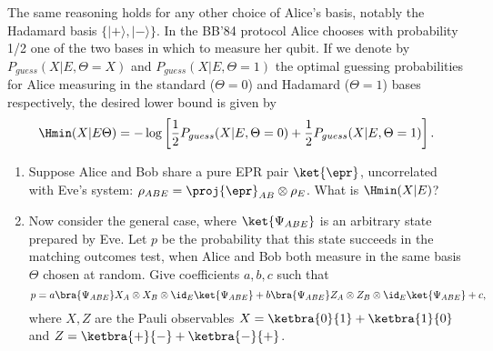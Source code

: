 \begin{exercises}
The same reasoning holds for any other choice of Alice's basis, notably the Hadamard basis $\{|+\rangle,|-\rangle\}$. In the BB'84 protocol Alice chooses with probability 1/2 one of the two bases in which to measure her qubit. If we denote by $P_{guess}(X|E,\Theta=X)$ and $P_{guess}(X|E,\Theta=1)$ the optimal guessing probabilities for Alice measuring in the standard ($\Theta=0$) and Hadamard ($\Theta=1$) bases respectively, the desired lower bound is given by
$$\Hmin(X|E\Theta) = -\log \left[\frac{1}{2}P_{guess}(X|E,\Theta=0)+\frac{1}{2}P_{guess}(X|E,\Theta=1)\right].$$
\begin{enumerate}
\item Suppose Alice and Bob share a pure EPR pair $\ket{\epr}$, uncorrelated with Eve's system: $\rho_{ABE} = \proj{\epr}_{AB} \otimes \rho_E$. What is $\Hmin(X|E)$?
%
%
\item Now consider the general case, where $\ket{\Psi_{ABE}}$ is an arbitrary state prepared by Eve. Let $p$ be the probability that this state succeeds in the matching outcomes test, when Alice and Bob both measure in the same basis $\Theta$ chosen at random. Give coefficients $a,b,c$ such that
$$p = a \bra{\Psi_{ABE}} X_A \otimes X_B \otimes \id_E \ket{\Psi_{ABE}} + b\bra{\Psi_{ABE}} Z_A \otimes Z_B \otimes \id_E \ket{\Psi_{ABE}} + c,$$
where $X,Z$ are the Pauli observables $X = \ketbra{0}{1} + \ketbra{1}{0}$ and $Z = \ketbra{+}{-} + \ketbra{-}{+}$.

\end{enumerate}
\end{exercises}
